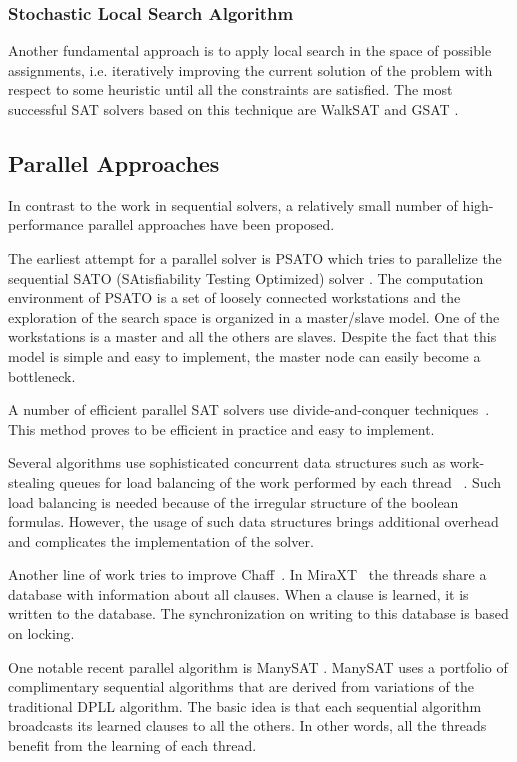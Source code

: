 \documentclass[letterpaper, compsoc, conference]{IEEEtran}
\begin{document}
\subsubsection{Stochastic Local Search Algorithm}
Another fundamental approach is to apply local search in the space of possible
assignments, i.e. iteratively improving the current solution of the
problem with respect to some heuristic until all the constraints are satisfied.
The most successful SAT solvers based on this technique are WalkSAT
\cite{Selman95localsearch} and GSAT \cite{Selman1992}.

\subsection{Parallel Approaches}
In contrast to the work in sequential solvers, a relatively small number of 
high-performance parallel approaches have been proposed.

\indent The earliest attempt for a parallel solver is PSATO \cite{PSATO} which tries
to parallelize the sequential SATO (SAtisfiability Testing Optimized) solver
\cite{Zhang94sato}. The computation environment of PSATO is a set of loosely connected 
workstations and the exploration of the search space is organized in a master/slave 
model. One of the workstations is a master and all the others are slaves. Despite 
the fact that this model is simple and easy to implement, the master node can easily 
become a bottleneck.

\indent A number of efficient parallel SAT solvers use divide-and-conquer 
techniques~\cite{PMiniSat, Bohm96, Lewis2007MiraXT, Gil08Pmsat}. This method
proves to be efficient in practice and easy to implement. 

\indent Several algorithms use sophisticated concurrent data structures such
as work-stealing queues for load balancing of the work performed by each thread
~\cite{Jurkowiak2005,PMiniSat}. Such load balancing is needed because of the 
irregular structure of the boolean formulas. However, the usage of such data 
structures brings additional overhead and complicates the implementation of the
solver.

\indent Another line of work tries to improve Chaff~\cite{Chrabakh03gradsat, 
Lewis2007MiraXT}. In MiraXT~\cite{Lewis2007MiraXT} the threads share a database with 
information about all clauses. When a clause is learned, it is written to the
database. The synchronization on writing to this database is based on locking.

\indent One notable recent parallel algorithm is ManySAT \citep{ManySAT}.
ManySAT uses a portfolio of complimentary sequential algorithms that are
derived from variations of the traditional DPLL algorithm. The basic idea is
that each sequential algorithm broadcasts its learned clauses to all the
others. In other words, all the threads benefit from the learning of each
thread. 
\end{document}

